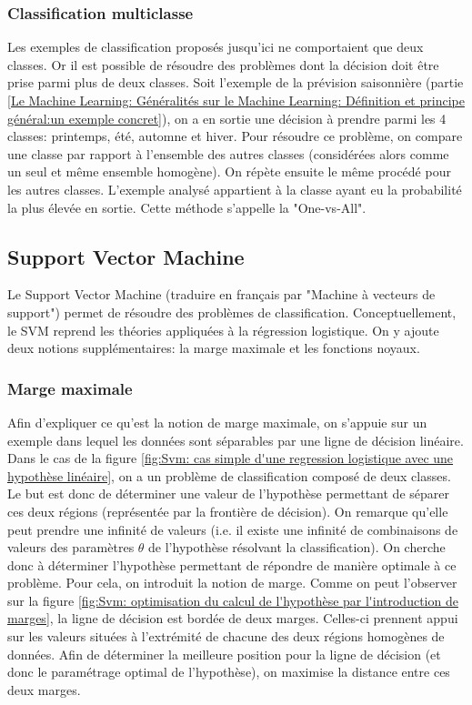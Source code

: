 \subsubsection{Classification multiclasse}
\label{Le Machine Learning: Les différents algorithmes: La regression logistique: La classification multi-classe}
Les exemples de classification proposés jusqu'ici ne comportaient que deux classes. Or il est possible de résoudre des problèmes dont la décision doit être prise parmi plus de deux classes. Soit l'exemple de la prévision saisonnière (partie \ref{Le Machine Learning: Généralités sur le Machine Learning: Définition et principe général:un exemple concret}), on a en sortie une décision à prendre parmi les 4 classes: printemps, été, automne et hiver. Pour résoudre ce problème, on compare une classe par rapport à l'ensemble des autres classes (considérées alors comme un seul et même ensemble homogène). On répète ensuite le même procédé pour les autres classes. L'exemple analysé appartient à la classe ayant eu la probabilité la plus élevée en sortie. Cette méthode s'appelle la "One-vs-All".


\subsection{Support Vector Machine}
\label{Le Machine Learning: Les différents algorithmes: SVM}
Le Support Vector Machine (traduire en français par "Machine à vecteurs de support") permet de résoudre des problèmes de classification. Conceptuellement, le SVM reprend les théories appliquées à la régression logistique. On y ajoute deux notions supplémentaires: la marge maximale et les fonctions noyaux.

\subsubsection{Marge maximale}
\label{Le Machine Learning: Les différents algorithmes: SVM: la marge maximale}
Afin d'expliquer ce qu'est la notion de marge maximale, on s'appuie sur un exemple dans lequel les données sont séparables par une ligne de décision linéaire. Dans le cas de la figure \ref{fig:Svm: cas simple d'une regression logistique avec une hypothèse linéaire}, on a un problème de classification composé de deux classes. Le but est donc de déterminer une valeur de l'hypothèse permettant de séparer ces deux régions (représentée par la frontière de décision). On remarque qu'elle peut prendre une infinité de valeurs (i.e. il existe une infinité de combinaisons de valeurs des paramètres $\theta$ de l'hypothèse résolvant la classification). On cherche donc à déterminer l'hypothèse permettant de répondre de manière optimale à ce problème. Pour cela, on introduit la notion de marge. Comme on peut l'observer sur la figure \ref{fig:Svm: optimisation du calcul de l'hypothèse par l'introduction de marges}, la ligne de décision est bordée de deux marges. Celles-ci prennent appui sur les valeurs situées à l'extrémité de chacune des deux régions homogènes de données. Afin de déterminer la meilleure position pour la ligne de décision (et donc le paramétrage optimal de l'hypothèse), on maximise la distance entre ces deux marges. 

